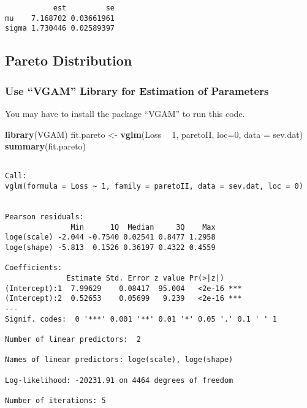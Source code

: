 \documentclass[]{book}
\newenvironment{Shaded}{\begin{snugshade}}{\end{snugshade}}
\newcommand{\KeywordTok}[1]{\textcolor[rgb]{0.13,0.29,0.53}{\textbf{#1}}}
\newcommand{\DataTypeTok}[1]{\textcolor[rgb]{0.13,0.29,0.53}{#1}}
\newcommand{\DecValTok}[1]{\textcolor[rgb]{0.00,0.00,0.81}{#1}}
\newcommand{\StringTok}[1]{\textcolor[rgb]{0.31,0.60,0.02}{#1}}
\newcommand{\OperatorTok}[1]{\textcolor[rgb]{0.81,0.36,0.00}{\textbf{#1}}}
\newcommand{\NormalTok}[1]{#1}
\theoremstyle{definition}
\theoremstyle{definition}
\theoremstyle{definition}
\theoremstyle{remark}
\begin{document}
\begin{verbatim}
           est         se
mu    7.168702 0.03661961
sigma 1.730446 0.02589397
\end{verbatim}

\subsection{Pareto Distribution}\label{pareto-distribution-1}

\subsubsection{\texorpdfstring{Use ``VGAM'' Library for Estimation of
Parameters}{Use VGAM Library for Estimation of Parameters}}\label{use-vgam-library-for-estimation-of-parameters-1}

You may have to install the package ``VGAM'' to run this code.

\begin{Shaded}
\begin{Highlighting}[]
\KeywordTok{library}\NormalTok{(VGAM)}
\NormalTok{fit.pareto <-}\StringTok{ }\KeywordTok{vglm}\NormalTok{(Loss }\OperatorTok{~}\StringTok{ }\DecValTok{1}\NormalTok{, paretoII, }\DataTypeTok{loc=}\DecValTok{0}\NormalTok{, }\DataTypeTok{data =}\NormalTok{ sev.dat)}
\KeywordTok{summary}\NormalTok{(fit.pareto)}
\end{Highlighting}
\end{Shaded}

\begin{verbatim}

Call:
vglm(formula = Loss ~ 1, family = paretoII, data = sev.dat, loc = 0)


Pearson residuals:
               Min      1Q  Median     3Q    Max
loge(scale) -2.044 -0.7540 0.02541 0.8477 1.2958
loge(shape) -5.813  0.1526 0.36197 0.4322 0.4559

Coefficients: 
              Estimate Std. Error z value Pr(>|z|)    
(Intercept):1  7.99629    0.08417  95.004   <2e-16 ***
(Intercept):2  0.52653    0.05699   9.239   <2e-16 ***
---
Signif. codes:  0 '***' 0.001 '**' 0.01 '*' 0.05 '.' 0.1 ' ' 1

Number of linear predictors:  2 

Names of linear predictors: loge(scale), loge(shape)

Log-likelihood: -20231.91 on 4464 degrees of freedom

Number of iterations: 5 
\end{verbatim}
\end{document}
